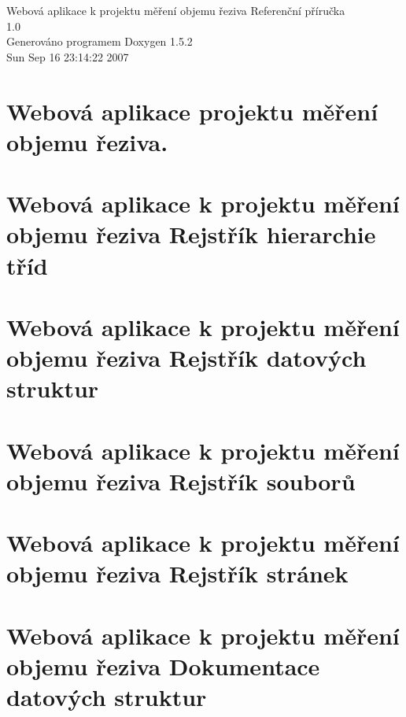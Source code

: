 \documentclass[a4paper]{book}
\begin{document}
\begin{titlepage}
\vspace*{7cm}
\begin{center}
{\Large Webová aplikace k projektu měření objemu řeziva Referenční příručka\\[1ex]\large 1.0 }\\
\vspace*{1cm}
{\large Generováno programem Doxygen 1.5.2}\\
\vspace*{0.5cm}
{\small Sun Sep 16 23:14:22 2007}\\
\end{center}
\end{titlepage}
\clearemptydoublepage
{}
\tableofcontents
\clearemptydoublepage
{}
\chapter{Webová aplikace projektu měření objemu řeziva. }
\label{index}
\chapter{Webová aplikace k projektu měření objemu řeziva Rejstřík hierarchie tříd}

\chapter{Webová aplikace k projektu měření objemu řeziva Rejstřík datových struktur}

\chapter{Webová aplikace k projektu měření objemu řeziva Rejstřík souborů}

\chapter{Webová aplikace k projektu měření objemu řeziva Rejstřík stránek}

\chapter{Webová aplikace k projektu měření objemu řeziva Dokumentace datových struktur}




\end{document}
